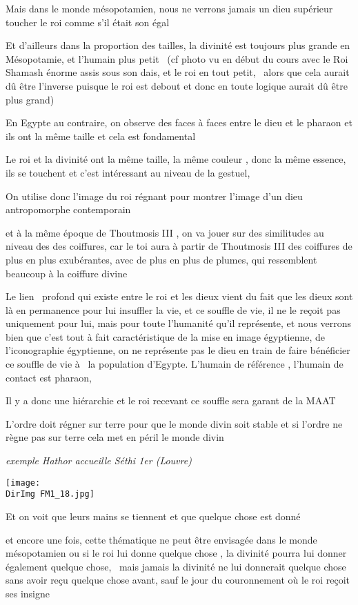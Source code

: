\documentclass[a4paper]{article}
\newcommand{\DirImg}{../img/FaivreMartin/}
\begin{document}
Mais dans le monde mésopotamien, nous ne verrons jamais un dieu supérieur toucher le roi comme s'il était son égal


Et d'ailleurs dans la proportion des tailles, la divinité est toujours plus grande en Mésopotamie, et l'humain plus
petit \ (cf photo vu en début du cours avec le Roi Shamash énorme assis sous son dais, et le roi en tout petit, \ alors
que cela aurait dû être l'inverse puisque le roi est debout et donc en toute logique aurait dû être plus grand)


En Egypte au contraire, on observe des faces à faces entre le dieu et le pharaon et ils ont la même taille et cela est
fondamental

Le roi et la divinité ont la même taille, la même couleur , donc la même essence, ils se touchent et c'est intéressant
au niveau de la gestuel, 

On utilise donc l'image du roi régnant pour montrer l'image d'un dieu antropomorphe contemporain

et à la même époque de Thoutmosis III , on va jouer sur des similitudes au niveau des des coiffures, car le toi aura à
partir de Thoutmosis III des coiffures de plus en plus exubérantes, avec de plus en plus de plumes, qui ressemblent
beaucoup à la coiffure divine


Le lien \ profond qui existe entre le roi et les dieux vient du fait que les dieux sont là en permanence pour lui
insuffler la vie, et ce souffle de vie, il ne le reçoit pas uniquement pour lui, mais pour toute l'humanité qu'il
représente, et nous verrons bien que c'est tout à fait caractéristique de la mise en image égyptienne, de
l'iconographie égyptienne, on ne représente pas le dieu en train de faire bénéficier ce souffle de vie à \ la
population d'Egypte. L'humain de référence , l'humain de contact est pharaon, 

Il y a donc une hiérarchie et le roi recevant ce souffle sera garant de la MAAT


L'ordre doit régner sur terre pour que le monde divin soit stable et si l'ordre ne règne pas sur terre cela met en péril
le monde divin


\textit{exemple Hathor accueille Séthi 1er (Louvre)}


\texttt{[image: \\DirImg FM1\_18.jpg]} 


Et on voit que leurs mains se tiennent et que quelque chose est donné

et encore une fois, cette thématique ne peut être envisagée dans le monde mésopotamien ou si le roi lui donne quelque
chose , la divinité pourra lui donner également quelque chose, \ mais jamais la divinité ne lui donnerait quelque chose
sans avoir reçu quelque chose avant, sauf le jour du couronnement où le roi reçoit ses insigne
\end{document}
